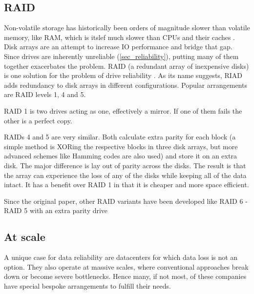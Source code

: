         \subsection{RAID}

            Non-volatile storage has historically been orders of magnitude
            slower than volatile memory, like RAM, which is itslef much slower
            than CPUs and their caches \cite{IO_bottleneck}. Disk arrays are an
            attempt to increase IO performance and bridge that gap. Since
            drives are inherently unreliable (\ref{sec_reliability}), putting
            many of them together exacerbates the problem. RAID (a redundant
            array of inexpensive disks) is one solution for the problem of
            drive reliability \cite{RAID}. As its name suggests, RIAD adds
            redundancy to disk arrays in different configurations. Popular
            arrangements are RAID levels 1, 4 and 5.

            RAID 1 is two drives acting as one, effectively a mirror. If one of
            them fails the other is a perfect copy.

            RAIDs 4 and 5 are very similar. Both calculate extra parity for
            each block (a simple method is XORing the respective blocks in
            three disk arrays, but more advanced schemes like Hamming codes are
            also used) and store it on an extra disk. The major difference is
            lay out of parity across the disks. The result is that the array
            can experience the loss of any of the disks while keeping all of
            the data intact. It has a benefit over RAID 1 in that it is
            cheaper and more space efficient.

            Since the original paper, other RAID variants have been developed
            like RAID 6 \cite{RAID6} - RAID 5 with an extra parity drive

        \subsection{At scale}

            A unique case for data reliability are datacenters for which data
            loss is not an option. They also operate at massive scales, where
            conventional approaches break down or become severe bottlenecks.
            Hence many, if not most, of these companies have special bespoke
            arrangements to fulfill their needs.

